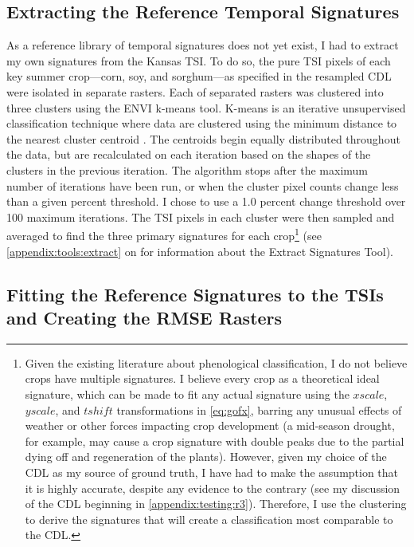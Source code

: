 \subsection{Extracting the Reference Temporal Signatures}
\label{methods:sigextraction}

As a reference library of temporal signatures does not yet exist, I had to extract my own signatures from the Kansas TSI. To do so, the pure TSI pixels of each key summer crop---corn, soy, and sorghum---as specified in the resampled CDL were isolated in separate rasters. Each of separated rasters was clustered into three clusters using the ENVI \autocite{envi5.0} k-means tool. K-means is an iterative unsupervised classification technique where data are clustered using the minimum distance to the nearest cluster centroid \autocites{kmeans2014}{matteucciclustering:}. The centroids begin equally distributed throughout the data, but are recalculated on each iteration based on the shapes of the clusters in the previous iteration. The algorithm stops after the maximum number of iterations have been run, or when the cluster pixel counts change less than a given percent threshold. I chose to use a 1.0 percent change threshold over 100 maximum iterations. The TSI pixels in each cluster were then sampled and averaged to find the three primary signatures for each crop\footnote{Given the existing literature about phenological classification, I do not believe crops have multiple signatures. I believe every crop as a theoretical ideal signature, which can be made to fit any actual signature using the $xscale$, $yscale$, and $tshift$ transformations in \autoref{eq:gofx}, barring any unusual effects of weather or other forces impacting crop development (a mid-season drought, for example, may cause a crop signature with double peaks due to the partial dying off and regeneration of the plants). However, given my choice of the CDL as my source of ground truth, I have had to make the assumption that it is highly accurate, despite any evidence to the contrary (see my discussion of the CDL beginning in \autoref{appendix:testing:r3}). Therefore, I use the clustering to derive the signatures that will create a classification most comparable to the CDL.} (see \autoref{appendix:tools:extract} on  for information about the Extract Signatures Tool).


\subsection{Fitting the Reference Signatures to the TSIs and Creating the RMSE Rasters}

